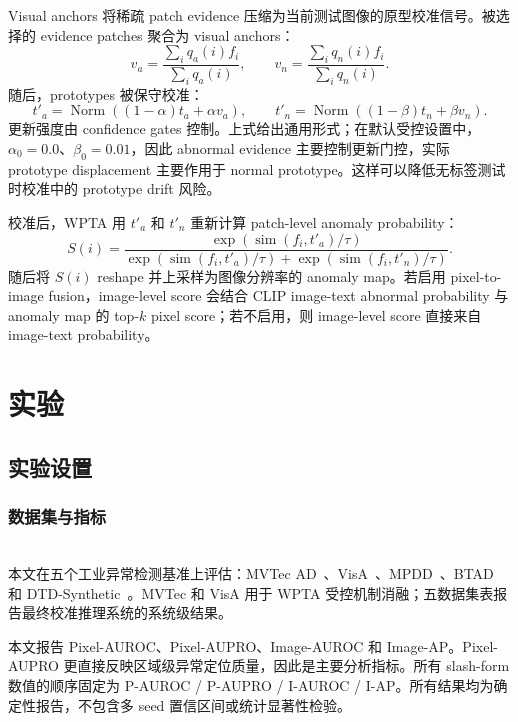 \documentclass[runningheads]{llncs}
\newcommand{\simi}{\operatorname{sim}}
\begin{document}
Visual anchors 将稀疏 patch evidence 压缩为当前测试图像的原型校准信号。被选择的 evidence patches 聚合为 visual anchors：
\begin{equation}
v_a=\frac{\sum_i q_a(i)f_i}{\sum_i q_a(i)},\qquad
v_n=\frac{\sum_i q_n(i)f_i}{\sum_i q_n(i)}.
\end{equation}
随后，prototypes 被保守校准：
\begin{equation}
t'_a=\operatorname{Norm}\left((1-\alpha)t_a+\alpha v_a\right),\qquad
t'_n=\operatorname{Norm}\left((1-\beta)t_n+\beta v_n\right).
\end{equation}
更新强度由 confidence gates 控制。上式给出通用形式；在默认受控设置中，$\alpha_0=0.0$、$\beta_0=0.01$，因此 abnormal evidence 主要控制更新门控，实际 prototype displacement 主要作用于 normal prototype。这样可以降低无标签测试时校准中的 prototype drift 风险。

校准后，WPTA 用 $t'_a$ 和 $t'_n$ 重新计算 patch-level anomaly probability：
\begin{equation}
S(i)=
\frac{\exp(\simi(f_i,t'_a)/\tau)}
{\exp(\simi(f_i,t'_a)/\tau)+\exp(\simi(f_i,t'_n)/\tau)} .
\end{equation}
随后将 $S(i)$ reshape 并上采样为图像分辨率的 anomaly map。若启用 pixel-to-image fusion，image-level score 会结合 CLIP image-text abnormal probability 与 anomaly map 的 top-$k$ pixel score；若不启用，则 image-level score 直接来自 image-text probability。

\section{实验}

\subsection{实验设置}

\subsubsection{数据集与指标}
\mbox{}\\
\noindent
本文在五个工业异常检测基准上评估：MVTec AD~\cite{bergmann2019mvtec,bergmann2021mvtec}、VisA~\cite{zou2022visa}、MPDD~\cite{jezek2021deep}、BTAD~\cite{mishra2021vt} 和 DTD-Synthetic~\cite{aota2023zero}。MVTec 和 VisA 用于 WPTA 受控机制消融；五数据集表报告最终校准推理系统的系统级结果。

本文报告 Pixel-AUROC、Pixel-AUPRO、Image-AUROC 和 Image-AP。Pixel-AUPRO 更直接反映区域级异常定位质量，因此是主要分析指标。所有 slash-form 数值的顺序固定为 P-AUROC / P-AUPRO / I-AUROC / I-AP。所有结果均为确定性报告，不包含多 seed 置信区间或统计显著性检验。
\end{document}
